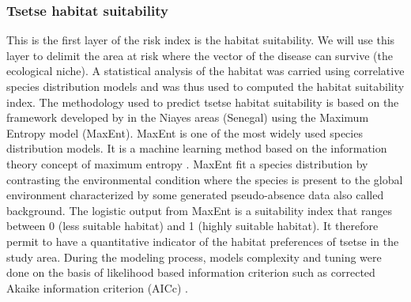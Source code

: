 \documentclass[10pt]{article}
\begin{document}
\subsubsection*{Tsetse habitat suitability}
\label{unnumbered-9}
This is the first layer of the risk index is the habitat suitability. 
We will use this layer to delimit the area at risk where the vector of the disease can survive (the ecological niche).
A statistical analysis of the habitat was carried using correlative species distribution models and 
was thus used to computed the habitat suitability index. 
The methodology used to predict tsetse habitat suitability is based on the framework developed by \cite{dicko2014using} in the Niayes areas (Senegal) using the Maximum Entropy model (MaxEnt).
MaxEnt is one of the most widely used species distribution models. It is a machine learning method based on the information theory concept of maximum entropy \cite{elith2011statistical}.  
MaxEnt fit a species distribution by contrasting the environmental condition where the species is present to the global environment characterized by some generated pseudo-absence data also called background.
The logistic output from MaxEnt is a suitability index that ranges between 0 (less suitable habitat) and 1 (highly suitable habitat). It therefore permit to have a quantitative indicator of the habitat preferences
of tsetse in the study area. During the modeling process, models complexity and tuning were done on the basis of likelihood based information criterion such as corrected Akaike information criterion (AICc) \cite{warren2011ecological}.
\end{document}
